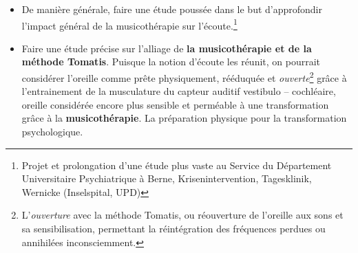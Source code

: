 \begin{itemize}
\item De manière générale, faire une étude poussée dans le but d'approfondir l'impact général de la
  musicothérapie sur l'écoute.\footnote{ Projet et
  prolongation d'une étude plus vaste au Service du
  Département Universitaire Psychiatrique à Berne, Krisenintervention,
  Tagesklinik, Wernicke (Inselspital, UPD) }
   \item
     Faire une étude précise sur l'alliage de \textbf{la
       musicothérapie et de la méthode Tomatis}. Puisque la notion d'écoute les réunit, on
     pourrait considérer l'oreille comme
prête physiquement, rééduquée et \textit{ouverte}\footnote{L'\emph{ouverture} avec la méthode Tomatis, ou réouverture de l'oreille
aux sons et sa sensibilisation, permettant la réintégration
des fréquences perdues ou annihilées inconsciemment. }  grâce à l'entrainement de la musculature du capteur auditif
vestibulo -- cochléaire, oreille considérée encore plus sensible et perméable à une transformation  grâce à la \textbf{musicothérapie}. La préparation  physique pour la transformation psychologique.


\end{itemize}

